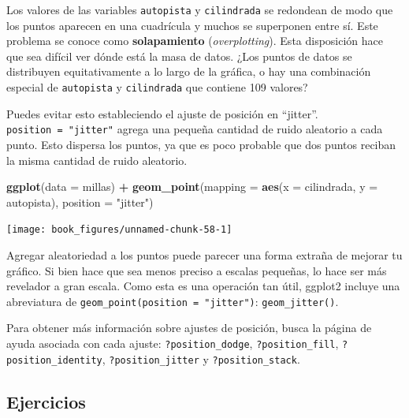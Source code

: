 \documentclass[11pt,oneside]{report}
\newenvironment{Shaded}{\begin{snugshade}}{\end{snugshade}}
\newcommand{\DataTypeTok}[1]{\textcolor[rgb]{0.13,0.29,0.53}{#1}}
\newcommand{\KeywordTok}[1]{\textcolor[rgb]{0.13,0.29,0.53}{\textbf{#1}}}
\newcommand{\NormalTok}[1]{#1}
\newcommand{\OperatorTok}[1]{\textcolor[rgb]{0.81,0.36,0.00}{\textbf{#1}}}
\newcommand{\StringTok}[1]{\textcolor[rgb]{0.31,0.60,0.02}{#1}}
\begin{document}
Los valores de las variables \texttt{autopista} y \texttt{cilindrada} se
redondean de modo que los puntos aparecen en una cuadrícula y muchos se
superponen entre sí. Este problema se conoce como \textbf{solapamiento}
(\emph{overplotting}). Esta disposición hace que sea difícil ver dónde
está la masa de datos. ¿Los puntos de datos se distribuyen
equitativamente a lo largo de la gráfica, o hay una combinación especial
de \texttt{autopista} y \texttt{cilindrada} que contiene 109 valores?

Puedes evitar esto estableciendo el ajuste de posición en ``jitter''.
\texttt{position\ =\ "jitter"} agrega una pequeña cantidad de ruido
aleatorio a cada punto. Esto dispersa los puntos, ya que es poco
probable que dos puntos reciban la misma cantidad de ruido aleatorio.

\begin{Shaded}
\begin{Highlighting}[]
\KeywordTok{ggplot}\NormalTok{(}\DataTypeTok{data =}\NormalTok{ millas) }\OperatorTok{+}
\StringTok{  }\KeywordTok{geom_point}\NormalTok{(}\DataTypeTok{mapping =} \KeywordTok{aes}\NormalTok{(}\DataTypeTok{x =}\NormalTok{ cilindrada, }\DataTypeTok{y =}\NormalTok{ autopista), }\DataTypeTok{position =} \StringTok{"jitter"}\NormalTok{)}
\end{Highlighting}
\end{Shaded}

\begin{center}\texttt{[image: book\_figures/unnamed-chunk-58-1]} \end{center}

Agregar aleatoriedad a los puntos puede parecer una forma extraña de
mejorar tu gráfico. Si bien hace que sea menos preciso a escalas
pequeñas, lo hace ser más revelador a gran escala. Como esta es una
operación tan útil, ggplot2 incluye una abreviatura de
\texttt{geom\_point(position\ =\ "jitter")}: \texttt{geom\_jitter()}.

Para obtener más información sobre ajustes de posición, busca la página
de ayuda asociada con cada ajuste: \texttt{?position\_dodge},
\texttt{?position\_fill}, \texttt{?position\_identity},
\texttt{?position\_jitter} y \texttt{?position\_stack}.

\hypertarget{ejercicios-5}{%
\subsection{Ejercicios}\label{ejercicios-5}}
\end{document}
